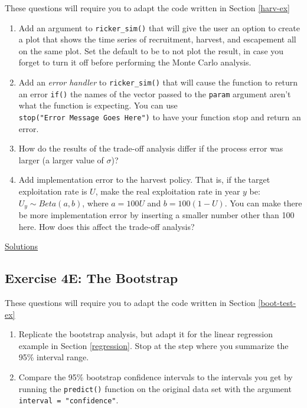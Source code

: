 \documentclass[]{book}
\providecommand{\tightlist}{%
  \setlength{\itemsep}{0pt}\setlength{\parskip}{0pt}}
\theoremstyle{definition}
\theoremstyle{definition}
\theoremstyle{definition}
\theoremstyle{remark}
\begin{document}
These questions will require you to adapt the code written in Section
\ref{harv-ex}

\begin{enumerate}
\def\labelenumi{\arabic{enumi}.}
\tightlist
\item
  Add an argument to \texttt{ricker\_sim()} that will give the user an
  option to create a plot that shows the time series of recruitment,
  harvest, and escapement all on the same plot. Set the default to be to
  not plot the result, in case you forget to turn it off before
  performing the Monte Carlo analysis.
\item
  Add an \emph{error handler} to \texttt{ricker\_sim()} that will cause
  the function to return an error \texttt{if()} the names of the vector
  passed to the \texttt{param} argument aren't what the function is
  expecting. You can use \texttt{stop("Error\ Message\ Goes\ Here")} to
  have your function stop and return an error.
\item
  How do the results of the trade-off analysis differ if the process
  error was larger (a larger value of \(\sigma\))?
\item
  Add implementation error to the harvest policy. That is, if the target
  exploitation rate is \(U\), make the real exploitation rate in year
  \(y\) be: \(U_y \sim Beta(a,b)\), where \(a = 100U\) and
  \(b = 100(1-U)\). You can make there be more implementation error by
  inserting a smaller number other than 100 here. How does this affect
  the trade-off analysis?
\end{enumerate}

\protect\hyperlink{ex4d-answers}{Solutions}

\subsection*{Exercise 4E: The
Bootstrap}\label{exercise-4e-the-bootstrap}

These questions will require you to adapt the code written in Section
\ref{boot-test-ex}

\begin{enumerate}
\def\labelenumi{\arabic{enumi}.}
\tightlist
\item
  Replicate the bootstrap analysis, but adapt it for the linear
  regression example in Section \ref{regression}. Stop at the step where
  you summarize the 95\% interval range.
\item
  Compare the 95\% bootstrap confidence intervals to the intervals you
  get by running the \texttt{predict()} function on the original data
  set with the argument \texttt{interval\ =\ "confidence"}.
\end{enumerate}
\end{document}

